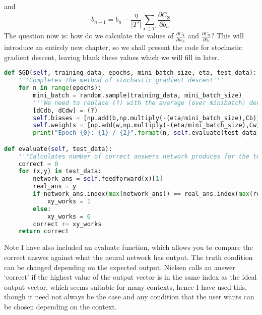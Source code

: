 \documentclass[10pt]{article}
\begin{document}
and
\[
b_{n+1} = b_n - \frac{\eta}{|T'|} \sum_{\mathbf{x} \in T'} \frac{\partial C_{\mathbf{x}}}{\partial b_n}
\]
The question now is: how do we calculate the values of $\frac{\partial C_{\mathbf{x}}}{\partial w_n}$ and $\frac{\partial C_{\mathbf{x}}}{\partial b_n}$? This will introduce an entirely new chapter, so we shall present the code for stochastic gradient descent, leaving blank these values which we will fill in later.
\begin{lstlisting}[language=Python, breaklines, basicstyle=\small]
def SGD(self, training_data, epochs, mini_batch_size, eta, test_data):
	'''Completes the method of stochastic gradient descent'''
	for n in range(epochs):
		mini_batch = random.sample(training_data, mini_batch_size)
		'''We need to replace (?) with the average (over minibatch) derivative of C wrt each term in bias/weight'''
		[dCdb, dCdw] = (?)
		self.biases = [np.add(b,np.multiply(-(eta/mini_batch_size),Cb)) for b, Cb in zip(self.biases, dCdb)]
		self.weights = [np.add(w,np.multiply(-(eta/mini_batch_size),Cw)) for w, Cw in zip(self.weights, dCdw)]
		print("Epoch {0}: {1} / {2}".format(n, self.evaluate(test_data), len(test_data)))

def evaluate(self, test_data):
	'''Calculates number of correct answers network produces for the test data'''
	correct = 0
	for (x,y) in test_data:
		network_ans = self.feedforward(x)[1]
		real_ans = y
		if network_ans.index(max(network_ans)) == real_ans.index(max(real_ans)):
			xy_works = 1
		else:
			xy_works = 0
		correct += xy_works
	return correct
\end{lstlisting}
Note I have also included an evaluate function, which allows you to compare the correct answer against what the neural network has output. The truth condition can be changed depending on the expected output. Nielsen calls an answer `correct' if the highest value of the output vector is in the same index as the ideal output vector, which seems suitable for many contexts, hence I have used this, though it need not always be the case and any condition that the user wants can be chosen depending on the context.
\end{document}
